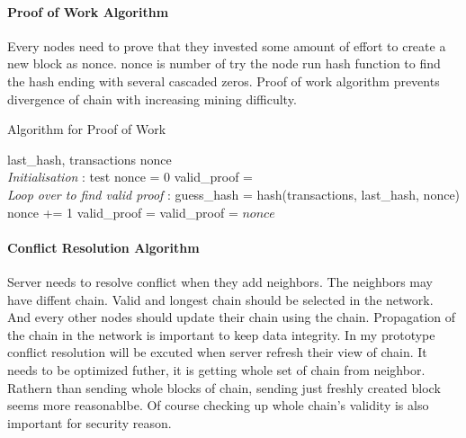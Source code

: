 \documentclass[conference]{IEEEtran}
\begin{document}
\paragraph{Proof of Work Algorithm}
Every nodes need to prove that they invested some amount of effort to create a new block as nonce.
nonce is number of try the node run hash function to find the hash ending with several cascaded zeros.
Proof of work algorithm prevents divergence of chain with increasing mining difficulty.\cite{r4}

\begin{algorithm}
    \caption{Algorithm for Proof of Work}
    \begin{algorithmic}[1]
        \renewcommand{\algorithmicrequire}{\textbf{Input:}}
        \renewcommand{\algorithmicensure}{\textbf{Output:}}
        \REQUIRE last\_hash, transactions
        \ENSURE nonce
        \\ \textit{Initialisation} :
        \STATE test
        \STATE nonce = 0
        \STATE valid\_proof = \FALSE
        \\ \textit{Loop over to find valid proof} :
            \STATE guess\_hash = hash(transactions, last\_hash, nonce)
            \STATE nonce += 1
                \STATE valid\_proof = \TRUE
            \ELSE
                \STATE valid\_proof = \FALSE
            \ENDIF
        \ENDWHILE
        \RETURN $nonce$ 
    \end{algorithmic} 
\end{algorithm}


\paragraph{Conflict Resolution Algorithm}
Server needs to resolve conflict when they add neighbors.
The neighbors may have diffent chain.
Valid and longest chain should be selected in the network.
And every other nodes should update their chain using the chain.
Propagation of the chain in the network is important to keep data integrity.
In my prototype conflict resolution will be excuted when server refresh their view of chain.
It needs to be optimized futher, it is getting whole set of chain from neighbor.
Rathern than sending whole blocks of chain, sending just freshly created block seems more reasonablbe.
Of course checking up whole chain's validity is also important for security reason.
\end{document}

